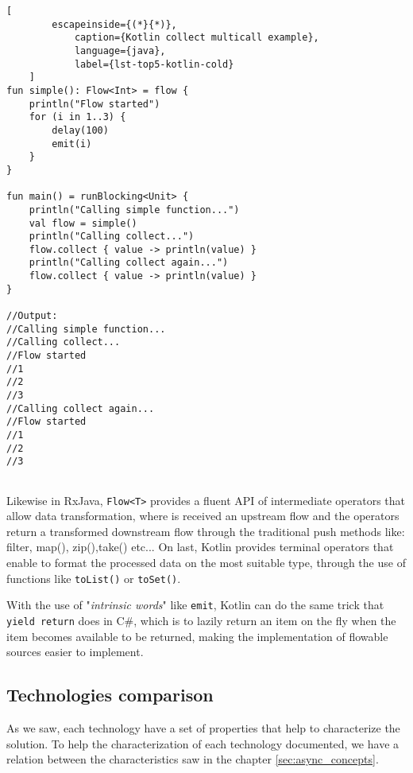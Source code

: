 \begin{center}
	\lstset{basicstyle=\scriptsize\ttfamily,frame=bottomline}
	\begin{minipage}[t][][b]{.46\textwidth}
	\begin{lstlisting}[
		escapeinside={(*}{*)},
			caption={Kotlin collect multicall example},
			language={java},
			label={lst-top5-kotlin-cold}
	]
fun simple(): Flow<Int> = flow { 
	println("Flow started")
	for (i in 1..3) {
		delay(100)
		emit(i)
	}
}

fun main() = runBlocking<Unit> {
	println("Calling simple function...")
	val flow = simple()
	println("Calling collect...")
	flow.collect { value -> println(value) } 
	println("Calling collect again...")
	flow.collect { value -> println(value) } 
}

//Output:
//Calling simple function...
//Calling collect...
//Flow started
//1
//2
//3
//Calling collect again...
//Flow started
//1
//2
//3
	
	\end{lstlisting}
	\end{minipage}
\end{center}


Likewise in RxJava, \texttt{Flow<T>} provides a fluent API of intermediate operators that allow data transformation, where is received an upstream  flow and the operators return a transformed downstream flow through the traditional push methods like: filter, map(), zip(),take() etc... 
On last, Kotlin provides terminal operators that enable to format the processed data on the most suitable type, through the use of functions like \texttt{toList()} or \texttt{toSet()}.

With the use of "\textit{intrinsic words}" like \texttt{emit}, Kotlin can do the same trick that \texttt{yield return} does in C\#, which is to lazily return an item on the fly when the item becomes available to be returned, making the implementation of flowable sources easier to implement.





\subsection{Technologies comparison}

As we saw, each technology have a set of properties that help to characterize the solution.
To help the characterization of each technology documented, we have a relation between the characteristics saw in the chapter \ref{sec:async_concepts}.

